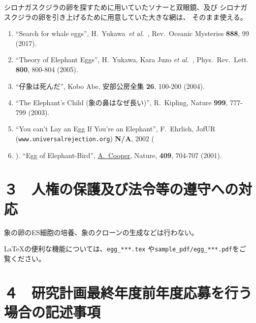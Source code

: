 \documentclass[11pt,a4j,dvipdfmx]{jarticle} 					%
\newcommand{\研究課題名}{象の卵}
\newcommand{\研究機関名}{逢坂大学}
\newcommand{\研究代表者氏名}{湯川秀樹}
\newcommand{\研究期間の最終元号年度}{12}  %
\newcommand{\paper}[6]{%
	\item ``#1'', #2, #3 {\bf #4}, #5 (#6).			%
}
\newcommand{\etal}{\textit{et al.\ }}
\newcommand{\yukawa}{H.~Yukawa}					%
\newcommand{\prl}{Phys.\ Rev.\ Lett.\ }		%
\begin{document}
	シロナガスクジラの卵を探すために用いていたソナーと双眼鏡、及び
	シロナガスクジラの卵を引き上げるために用意していた大きな網は、
	そのまま使える。
	\begin{enumerate}
		\paper{Search for whale eggs}{\yukawa\ \etal}{Rev.\ Oceanic Mysteries}{888}{99}{2017}
			\label{pub:whale}
				
		\paper{Theory of Elephant Eggs}{\yukawa, Kara Juzo \etal}{\prl}{800}{800-804}{2005}
			\label{pub:theoegg}
				
		\paper{仔象は死んだ}{Kobo Abe}{安部公房全集}{26}{100-200}{2004}
		
		\paper{The Elephant's Child (象の鼻はなぜ長い)}{R.~Kipling}{Nature}{999}{777-799}{2003}

		\paper{You can't Lay an Egg If You're an Elephant}{F.~Ehrlich}
			{JofUR\\({\tt www.universalrejection.org})}{{\bf N/A}}{2002}
		
		\item ``Egg of Elephant-Bird'', 
				\underline{A.~Cooper},
				Nature, {\bf 409}, 704-707 (2001).	%
	\end{enumerate}




\section{３　人権の保護及び法令等の遵守への対応}

	象の卵のES細胞の培養、象のクローンの生成などは行わない。

	\LaTeX の便利な機能については、\texttt{egg\_***.tex} や\texttt{sample\_pdf/egg\_***.pdf}をご覧ください。




\section{４　研究計画最終年度前年度応募を行う場合の記述事項}
\end{document}
